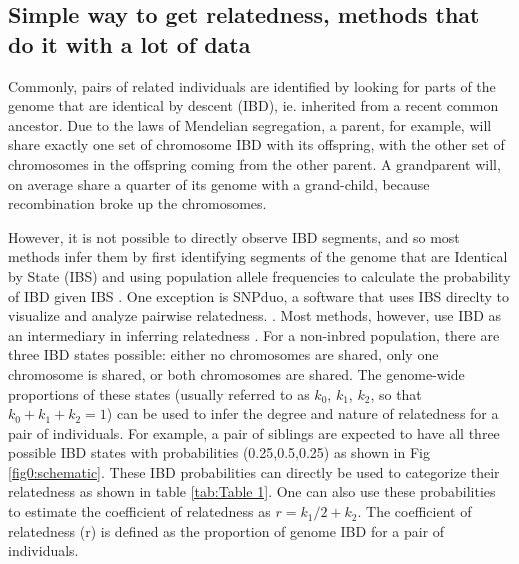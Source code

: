 \documentclass[12pt, letterpaper]{article}
\begin{document}
\subsection{Simple way to get relatedness, methods that do it with a lot of data}

Commonly, pairs of related individuals are identified by looking for parts of the genome that are identical by descent (IBD), ie. inherited from a recent common ancestor. Due to the laws of Mendelian segregation, a parent, for example, will share exactly one set of chromosome IBD with its offspring, with the other set of chromosomes in the offspring coming from the other parent. A grandparent will, on average share a quarter of its genome with a grand-child, because recombination broke up the chromosomes.

However, it is not possible to directly observe IBD segments, and so most methods infer them by first identifying segments of the genome that are Identical by State (IBS) and using population allele frequencies to calculate the probability of IBD given IBS \cite{vai_KINship_2020}. One exception is SNPduo, a software that uses IBS direclty to visualize and analyze pairwise relatedness. \cite{roberson_visualization_2009}. Most methods, however, use IBD as an intermediary in inferring relatedness \cite{boehnke_accurate_1997,lynch_estimation_1999, albrechtsen_natural_2010, purcell_plink_2007}. For a non-inbred population, there are three IBD states possible: either no chromosomes are shared, only one chromosome is shared, or both chromosomes are shared. The genome-wide proportions of these states (usually referred to as $k_0$, $k_1$, $k_2$, so that $k_0+k_1+k_2=1$) can be used to infer the degree and nature of relatedness for a pair of individuals. For example, a pair of siblings are expected to have all three possible IBD states with probabilities (0.25,0.5,0.25) as shown in Fig \ref{fig0:schematic}. These IBD probabilities can directly be used to categorize their relatedness as shown in table \ref{tab:Table 1}. One can also use these probabilities to estimate the coefficient of relatedness as $r= k_1/2 + k_2$. The coefficient of relatedness (r) is defined as the proportion of genome IBD for a pair of individuals.
\end{document}
